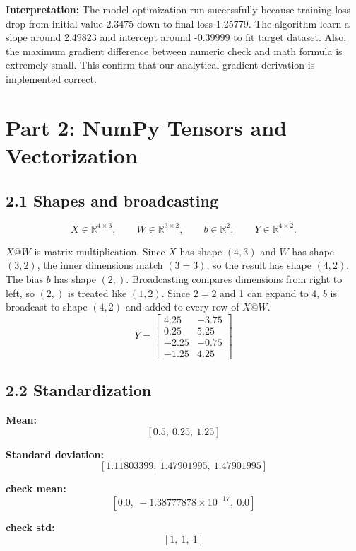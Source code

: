\documentclass[11pt]{article}
\begin{document}
\noindent\textbf{Interpretation:}
The model optimization run successfully because training loss drop from initial value 2.3475 down to final loss 1.25779. The algorithm learn a slope around 2.49823 and intercept around -0.39999 to fit target dataset. Also, the maximum gradient difference between numeric check and math formula is extremely small. This confirm that our analytical gradient derivation is implemented correct.

\section*{Part 2: NumPy Tensors and Vectorization}

\subsection*{2.1 Shapes and broadcasting}
\[
  X \in \mathbb{R}^{4\times3}, \qquad
  W \in \mathbb{R}^{3\times2}, \qquad
  b \in \mathbb{R}^{2}, \qquad
  Y \in \mathbb{R}^{4\times2}.
\]

$X @ W$ is matrix multiplication. Since $X$ has shape $(4,3)$ and $W$ has shape $(3,2)$, the inner dimensions match $(3 = 3)$, so the result has shape $(4,2)$. The bias $b$ has shape $(2,)$. Broadcasting compares dimensions from right to left, so $(2,)$ is treated like $(1,2)$. Since $2 = 2$ and 1 can expand to 4, $b$ is broadcast to shape $(4,2)$ and added to every row of $X @ W$.
\[
Y =
\begin{bmatrix}
4.25 & -3.75 \\
0.25 & 5.25 \\
-2.25 & -0.75 \\
-1.25 & 4.25
\end{bmatrix}
\]

\subsection*{2.2 Standardization}

\noindent\textbf{Mean:}
\[
[0.5,\ 0.25,\ 1.25]
\]

\noindent\textbf{Standard deviation:}
\[
[1.11803399,\ 1.47901995,\ 1.47901995]
\]

\noindent\textbf{check mean:}
\[
[0.0,\ -1.38777878\times10^{-17},\ 0.0]
\]

\noindent\textbf{check std:}
\[
[1,\ 1,\ 1]
\]
\end{document}
